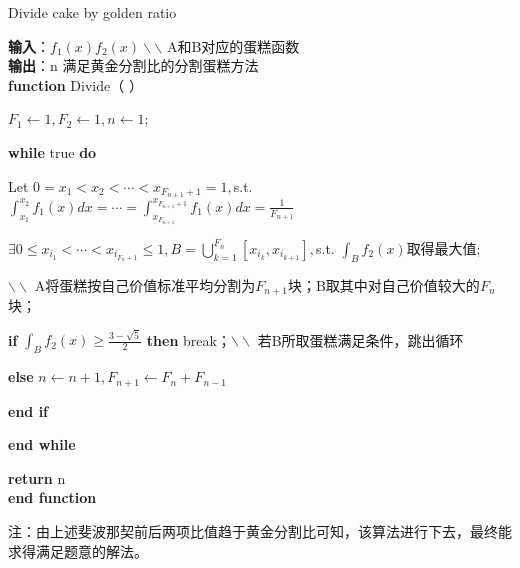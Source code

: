 \documentclass[fontset=windows,11pt]{article}
\begin{document}
    \begin{algorithm}
        \caption{Divide cake by golden ratio}
    \textbf{输入}：$f_1(x) f_2(x) \backslash\backslash$ A和B对应的蛋糕函数 \\
    \textbf{输出}：n 满足黄金分割比的分割蛋糕方法\\
    \textbf{function} Divide（ ）
  
    \qquad $F_1\leftarrow 1,F_2\leftarrow 1,n\leftarrow 1$;

    \qquad \textbf{while} true \textbf{do}
 
    \qquad\qquad Let $0=x_1<x_2<\cdots <x_{F_{n+1}+1}=1,$s.t.$\int_{x_1}^{x_2}f_1(x)dx=\cdots=\int_{x_{F_{n+1}}}^{x_{F_{n+1}+1}}f_1(x)dx=\frac{1}{F_{n+1}}$ 

    \qquad\qquad $\exists 0\leq x_{i_1}<\cdots<x_{i_{F_n+1}}\leq 1,B=\bigcup_{k=1}^{F_n}[x_{i_k},x_{i_{k+1}}],$s.t. $\int_Bf_2(x)$取得最大值;
    
    \qquad\qquad $\backslash \backslash$ A将蛋糕按自己价值标准平均分割为$F_{n+1}$块；B取其中对自己价值较大的$F_n$块；

    \qquad\qquad \textbf{if} $\int_Bf_2(x) \geq \frac{3-\sqrt{5}}{2}$ \textbf{then} break；$\backslash\backslash$ 若B所取蛋糕满足条件，跳出循环

    \qquad\qquad \textbf{else} $n\leftarrow n+1, F_{n+1}\leftarrow F_n+F_{n-1}$
        
    \qquad\qquad \textbf{end if}

    \qquad\textbf{end while}

    \qquad\textbf{return} n \\
    \textbf{end function}
    \end{algorithm}
    注：由上述斐波那契前后两项比值趋于黄金分割比可知，该算法进行下去，最终能求得满足题意的解法。    
\end{document}
